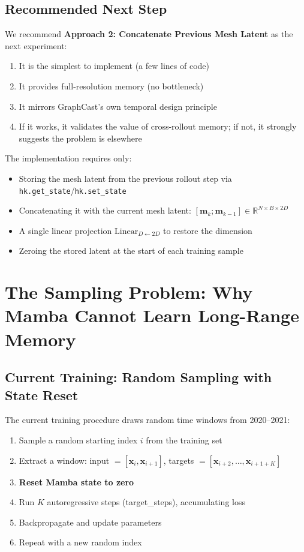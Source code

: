 \documentclass[11pt,a4paper]{article}
\begin{document}
\subsection{Recommended Next Step}

We recommend \textbf{Approach 2: Concatenate Previous Mesh Latent} as the next experiment:
\begin{enumerate}[nosep]
  \item It is the simplest to implement (a few lines of code)
  \item It provides full-resolution memory (no bottleneck)
  \item It mirrors GraphCast's own temporal design principle
  \item If it works, it validates the value of cross-rollout memory; if not, it strongly suggests the problem is elsewhere
\end{enumerate}

The implementation requires only:
\begin{itemize}[nosep]
  \item Storing the mesh latent from the previous rollout step via \texttt{hk.get\_state}/\texttt{hk.set\_state}
  \item Concatenating it with the current mesh latent: $[\mathbf{m}_k; \mathbf{m}_{k-1}] \in \mathbb{R}^{N \times B \times 2D}$
  \item A single linear projection $\text{Linear}_{D \leftarrow 2D}$ to restore the dimension
  \item Zeroing the stored latent at the start of each training sample
\end{itemize}

\section{The Sampling Problem: Why Mamba Cannot Learn Long-Range Memory}

\subsection{Current Training: Random Sampling with State Reset}

The current training procedure draws random time windows from 2020--2021:

\begin{enumerate}[nosep]
  \item Sample a random starting index $i$ from the training set
  \item Extract a window: input $= [\mathbf{x}_i, \mathbf{x}_{i+1}]$, targets $= [\mathbf{x}_{i+2}, \ldots, \mathbf{x}_{i+1+K}]$
  \item \textbf{Reset Mamba state to zero}
  \item Run $K$ autoregressive steps (target\_steps), accumulating loss
  \item Backpropagate and update parameters
  \item Repeat with a new random index
\end{enumerate}
\end{document}

